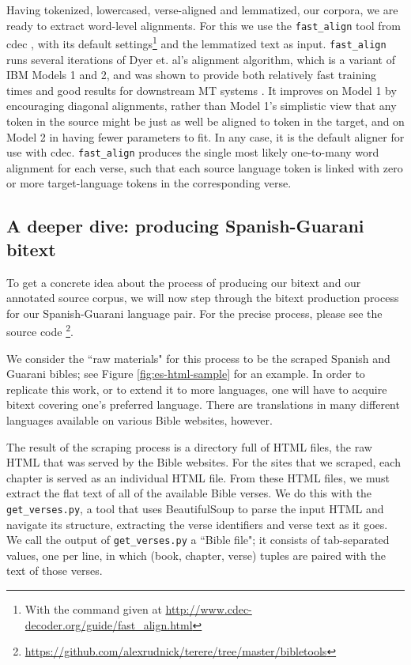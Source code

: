 Having tokenized, lowercased, verse-aligned and lemmatized, our corpora, we are
ready to extract word-level alignments.  For this we use the
\texttt{fast\_align} tool from cdec \cite{dyer-EtAl:2010:Demos}, with its
default settings\footnote{With the command given at
\url{http://www.cdec-decoder.org/guide/fast_align.html}} and the lemmatized
text as input.  \texttt{fast\_align} runs several iterations of Dyer et. al's
alignment algorithm, which is a variant of IBM Models 1 and 2, and was shown to
provide both relatively fast training times and good results for downstream MT
systems \cite{dyer-chahuneau-smith:2013:NAACL-HLT}. It improves on Model 1 by
encouraging diagonal alignments, rather than Model 1's simplistic view that any
token in the source might be just as well be aligned to token in the target,
and on Model 2 in having fewer parameters to fit. In any case, it is the
default aligner for use with cdec. \texttt{fast_align} produces the single most
likely one-to-many word alignment for each verse, such that each source
language token is linked with zero or more target-language tokens in the
corresponding verse.



\subsection{A deeper dive: producing Spanish-Guarani bitext}
To get a concrete idea about the process of producing our bitext and our
annotated source corpus, we will now step through the bitext production process
for our Spanish-Guarani language pair. For the precise process, please see the
source code
\footnote{\url{https://github.com/alexrudnick/terere/tree/master/bibletools}}.

We consider the ``raw materials" for this process to be the scraped Spanish and
Guarani bibles; see Figure \ref{fig:es-html-sample} for an example.  In order
to replicate this work, or to extend it to more languages, one will have to
acquire bitext covering one's preferred language. There are translations in
many different languages available on various Bible websites, however.

The result of the scraping process is a directory full of HTML files, the raw
HTML that was served by the Bible websites. For the sites that we scraped, each
chapter is served as an individual HTML file. From these HTML files, we must
extract the flat text of all of the available Bible verses.  We do this with
the \texttt{get\_verses.py}, a tool that uses BeautifulSoup to parse the input
HTML and navigate its structure, extracting the verse identifiers and verse
text as it goes. We call the output of \texttt{get\_verses.py} a ``Bible file";
it consists of tab-separated values, one per line, in which (book, chapter,
verse) tuples are paired with the text of those verses.

